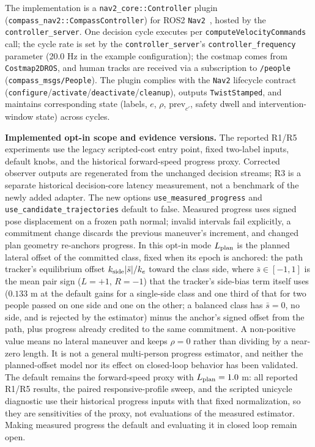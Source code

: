 \documentclass[11pt]{article}
\newcommand{\code}[1]{\texttt{#1}}
\begin{document}
The implementation is a \code{nav2\_core::Controller} plugin (\code{compass\_nav2::CompassController}) for ROS2 \texttt{Nav2}~\cite{macenski2020nav2}, hosted by the \code{controller\_server}. One decision cycle executes per \code{computeVelocityCommands} call; the cycle rate is set by the \code{controller\_server}'s \code{controller\_frequency} parameter (20.0 Hz in the example configuration); the costmap comes from \code{Costmap2DROS}, and human tracks are received via a subscription to \code{/people} (\code{compass\_msgs/People}). The plugin complies with the \texttt{Nav2} lifecycle contract (\code{configure}/\code{activate}/\code{deactivate}/\code{cleanup}), outputs \code{TwistStamped}, and maintains corresponding state (labels, $e$, $\rho$, $\text{prev}_{c'}$, safety dwell and intervention-window state) across cycles.

\textbf{Implemented opt-in scope and evidence versions.} The reported R1/R5 experiments use the legacy scripted-cost entry point, fixed two-label inputs, default knobs, and the historical forward-speed progress proxy. Corrected observer outputs are regenerated from the unchanged decision streams; R3 is a separate historical decision-core latency measurement, not a benchmark of the newly added adapter. The new options \code{use\_measured\_progress} and \code{use\_candidate\_trajectories} default to false. Measured progress uses signed pose displacement on a frozen path normal; invalid intervals fail explicitly, a commitment change discards the previous maneuver's increment, and changed plan geometry re-anchors progress. In this opt-in mode $L_{\rm plan}$ is the planned lateral offset of the committed class, fixed when its epoch is anchored: the path tracker's equilibrium offset $k_{\rm side}|\bar s|/k_e$ toward the class side, where $\bar s\in[-1,1]$ is the mean pair sign ($L=+1$, $R=-1$) that the tracker's side-bias term itself uses ($0.133$ m at the default gains for a single-side class and one third of that for two people passed on one side and one on the other; a balanced class has $\bar s=0$, no side, and is rejected by the estimator) minus the anchor's signed offset from the path, plus progress already credited to the same commitment. A non-positive value means no lateral maneuver and keeps $\rho=0$ rather than dividing by a near-zero length. It is not a general multi-person progress estimator, and neither the planned-offset model nor its effect on closed-loop behavior has been validated. The default remains the forward-speed proxy with $L_{\rm plan}=1.0$ m: all reported R1/R5 results, the paired responsive-profile sweep, and the scripted unicycle diagnostic use their historical progress inputs with that fixed normalization, so they are sensitivities of the proxy, not evaluations of the measured estimator. Making measured progress the default and evaluating it in closed loop remain open.
\end{document}

